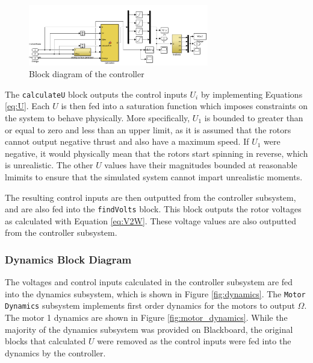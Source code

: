 \documentclass[12pt]{article}
\begin{document}
\begin{center}
\begin{figure}[H]
\captionsetup{width=1\textwidth}
\centering
\includegraphics[width=0.70\textwidth]{controller.png}
\caption{\label{fig:controller}Block diagram of the controller}
\end{figure}
\end{center}

The \texttt{calculateU} block outputs the control inputs $U_i$ by implementing Equations \ref{eq:U}. Each $U$ is then fed into a saturation function which imposes constraints on the system to behave physically. More specifically, $U_1$ is bounded to greater than or equal to zero and less than an upper limit, as it is assumed that the rotors cannot output negative thrust and also have a maximum speed. If $U_1$ were negative, it would physically mean that the rotors start spinning in reverse, which is unrealistic. The other $U$ values have their magnitudes bounded at reasonable lmimits to ensure that the simulated system cannot impart unrealistic moments.

The resulting control inputs are then outputted from the controller subsystem, and are also fed into the \texttt{findVolts} block. This block outputs the rotor voltages as calculated with Equation \ref{eq:V2W}. These voltage values are also outputted from the controller subsystem.

\subsubsection{Dynamics Block Diagram}
The voltages and control inputs calculated in the controller subsystem are fed into the dynamics subsystem, which is shown in Figure \ref{fig:dynamics}. The \texttt{Motor Dynamics} subsystem implements first order dynamics for the motors to output $\Omega$. The motor 1 dynamics are shown in Figure \ref{fig:motor_dynamics}. While the majority of the dynamics subsystem was provided on Blackboard, the original blocks that calculated $U$ were removed as the control inputs were fed into the dynamics by the controller.
\end{document}
